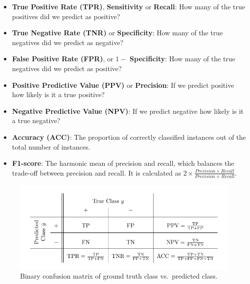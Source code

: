 \begin{itemize}
\tightlist
\item
  \textbf{True Positive
  Rate
  (TPR)}, \textbf{Sensitivity} or \textbf{Recall}: How many of the true
  positives did we predict as positive?
\item
  \textbf{True Negative
  Rate
  (TNR)} or \textbf{Specificity}: How many of the true negatives did we
  predict as negative?
\item
  \textbf{False Positive Rate (FPR)}, or
  \(1 -\) \textbf{Specificity}: How many of the true negatives did we
  predict as positive?
\item
  \textbf{Positive Predictive
  Value
  (PPV)} or \textbf{Precision}: If we predict positive how likely is it
  a true positive?
\item
  \textbf{Negative Predictive Value
  (NPV)}: If we predict negative how likely is it a true negative?
\item
  \textbf{Accuracy (ACC)}: The proportion of correctly
  classified instances out of the total number of instances.
\item
  \textbf{F1-score}: The harmonic mean of precision and
  recall, which balances the trade-off between precision and recall. It
  is calculated as
  \(2 \times \frac{Precision \times Recall}{Precision + Recall}\).
\end{itemize}

\begin{figure}

{\centering \includegraphics[width=1\textwidth,height=\textheight]{chapters/chapter3/Figures/confusion_matrix.pdf}

}

\caption{\label{fig-confusion}Binary confusion matrix of ground truth
class vs.~predicted class.}

\end{figure}

